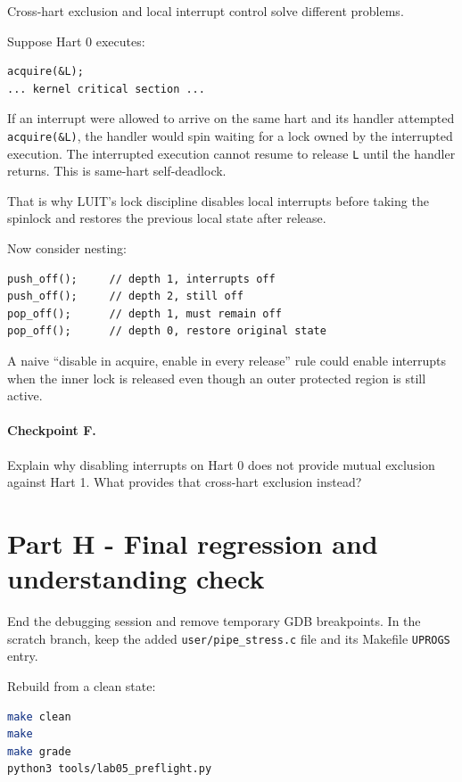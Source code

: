 \documentclass[11pt,a4paper]{article}
\newcommand{\file}[1]{\texttt{#1}}
\begin{document}
Cross-hart exclusion and local interrupt control solve different problems.

Suppose Hart 0 executes:

\begin{lstlisting}
acquire(&L);
... kernel critical section ...
\end{lstlisting}

If an interrupt were allowed to arrive on the same hart and its handler attempted \file{acquire(\&L)}, the handler would spin waiting for a lock owned by the interrupted execution. The interrupted execution cannot resume to release \file{L} until the handler returns. This is same-hart self-deadlock.

That is why LUIT's lock discipline disables local interrupts before taking the spinlock and restores the previous local state after release.

Now consider nesting:

\begin{lstlisting}
push_off();     // depth 1, interrupts off
push_off();     // depth 2, still off
pop_off();      // depth 1, must remain off
pop_off();      // depth 0, restore original state
\end{lstlisting}

A naive ``disable in acquire, enable in every release'' rule could enable interrupts when the inner lock is released even though an outer protected region is still active.

\paragraph{Checkpoint F.} Explain why disabling interrupts on Hart 0 does not provide mutual exclusion against Hart 1. What provides that cross-hart exclusion instead?

\section{Part H - Final regression and understanding check}

End the debugging session and remove temporary GDB breakpoints. In the scratch branch, keep the added \file{user/pipe\_stress.c} file and its Makefile \file{UPROGS} entry.

Rebuild from a clean state:

\begin{lstlisting}[language=bash]
make clean
make
make grade
python3 tools/lab05_preflight.py
\end{lstlisting}
\end{document}
